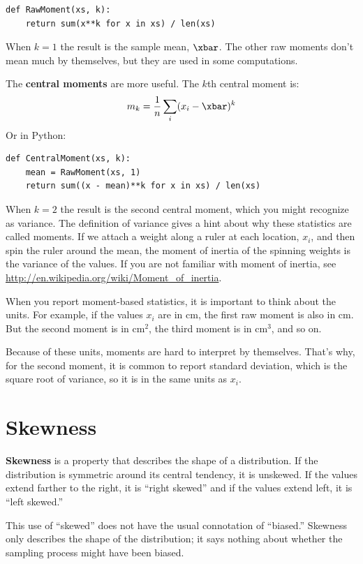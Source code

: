 \begin{verbatim}
def RawMoment(xs, k):
    return sum(x**k for x in xs) / len(xs)
\end{verbatim}

When $k=1$ the result is the sample mean, $\xbar$.  The other
raw moments don't mean much by themselves, but they are used
in some computations.

The {\bf central moments} are more useful.  The
$k$th central moment is:
%
\[ m_k = \frac{1}{n} \sum_i (x_i - \xbar)^k \]
%
Or in Python:

\begin{verbatim}
def CentralMoment(xs, k):
    mean = RawMoment(xs, 1)
    return sum((x - mean)**k for x in xs) / len(xs)
\end{verbatim}

When $k=2$ the result is the second central moment, which you might
recognize as variance.  The definition of variance gives a hint about
why these statistics are called moments.  If we attach a weight along a
ruler at each location, $x_i$, and then spin the ruler around
the mean, the moment of inertia of the spinning weights is the variance
of the values.  If you are not familiar with moment of inertia, see
\url{http://en.wikipedia.org/wiki/Moment_of_inertia}.  

When you report moment-based statistics, it is important to think
about the units.  For example, if the values $x_i$ are in cm, the
first raw moment is also in cm.  But the second moment is in
cm$^2$, the third moment is in cm$^3$, and so on.

Because of these units, moments are hard to interpret by themselves.
That's why, for the second moment, it is common to report standard
deviation, which is the square root of variance, so it is in the same
units as $x_i$.


\section{Skewness}

{\bf Skewness} is a property that describes the shape of a distribution.
If the distribution is symmetric around its central tendency, it is
unskewed.  If the values extend farther to the right, it is ``right
skewed'' and if the values extend left, it is ``left skewed.''

This use of ``skewed'' does not have the usual connotation of
``biased.''  Skewness only describes the shape of the distribution;
it says nothing about whether the sampling process might have been
biased.

